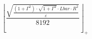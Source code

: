 \[\left\lfloor \frac{\sqrt{\frac{\left(1 + \Gamma^{2}\right) \cdot \sqrt{1 + \Gamma^{2}} \cdot Lbar \cdot R^{2}}{\varepsilon}}}{8192} \right\rfloor_{+}\]

